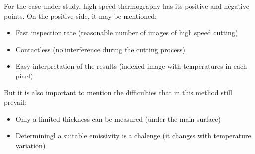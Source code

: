 	For the case under study, high speed thermography has its positive and negative points. On the positive side, it may be mentioned:

	\begin{itemize}
		\item Fast inspection rate (reasonable number of images of high speed cutting)
		\item Contactless (no interference during the cutting process)
		\item Easy interpretation of the results (indexed image with temperatures in each pixel)
	\end{itemize}

	But it is also important to mention the difficulties that in this method still prevail:
	
	\begin{itemize}
		\item Only a limited thickness can be measured (under the main surface)
		\item Determiningl a suitable emissivity is a chalenge (it changes with temperature variation)
	\end{itemize}
